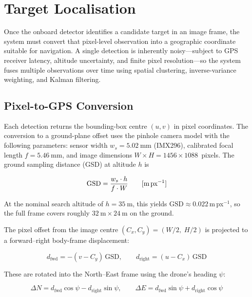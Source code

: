 \section{Target Localisation}\label{sec:localisation}

Once the onboard detector identifies a candidate target in an image frame, the system must convert that pixel-level observation into a geographic coordinate suitable for navigation. A single detection is inherently noisy---subject to GPS receiver latency, altitude uncertainty, and finite pixel resolution---so the system fuses multiple observations over time using spatial clustering, inverse-variance weighting, and Kalman filtering.

\subsection{Pixel-to-GPS Conversion}\label{sec:pixel-gps}

Each detection returns the bounding-box centre $(u, v)$ in pixel coordinates. The conversion to a ground-plane offset uses the pinhole camera model with the following parameters: sensor width $w_s = \SI{5.02}{\milli\metre}$ (IMX296), calibrated focal length $f = \SI{5.46}{\milli\metre}$, and image dimensions $W \times H = 1456 \times 1088$~pixels. The ground sampling distance (GSD) at altitude $h$ is

\begin{equation}\label{eq:gsd}
  \mathrm{GSD} = \frac{w_s \cdot h}{f \cdot W} \qquad [\text{m\,px}^{-1}]
\end{equation}

\noindent At the nominal search altitude of $h = \SI{35}{\metre}$, this yields $\mathrm{GSD} \approx 0.022$\,m\,px$^{-1}$, so the full frame covers roughly $\SI{32}{\metre} \times \SI{24}{\metre}$ on the ground.

The pixel offset from the image centre $(C_x, C_y) = (W/2,\; H/2)$ is projected to a forward--right body-frame displacement:

\begin{equation}\label{eq:body-offset}
  d_\mathrm{fwd} = -(v - C_y)\,\mathrm{GSD}, \qquad
  d_\mathrm{right} = (u - C_x)\,\mathrm{GSD}
\end{equation}

\noindent These are rotated into the North--East frame using the drone's heading $\psi$:

\begin{equation}\label{eq:ne-offset}
  \Delta N = d_\mathrm{fwd}\cos\psi - d_\mathrm{right}\sin\psi, \qquad
  \Delta E = d_\mathrm{fwd}\sin\psi + d_\mathrm{right}\cos\psi
\end{equation}


